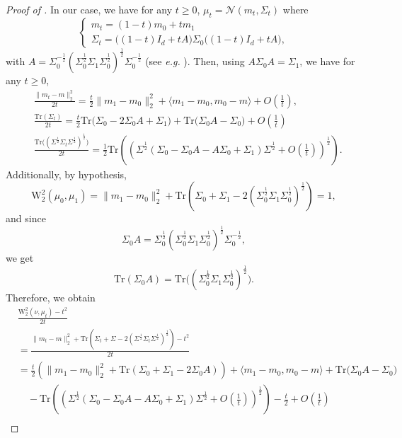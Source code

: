 \documentclass[twoside]{article}
\newcommand{\W}{\mathrm{W}}
\newcommand{\tr}{\mathrm{Tr}}
\def\mo{m_{0}}
\def\m1{m_{1}}
\def\So{\Sigma_{0}}
\def\S1{\Sigma_{1}}
\begin{document}
\begin{proof}[Proof of ]
    In our case, we have for any $t\ge 0$, $\mu_t =\mathcal{N}(m_t, \Sigma_t)$ where
    \begin{equation}
        \begin{cases}
            m_t = (1-t)\mo+t \m1 \\
            \Sigma_t = \big((1-t)I_d+t A\big)\So \big((1-t)I_d + t A\big),
        \end{cases}
    \end{equation}
    with $A=\So^{-\frac12}(\So^\frac12\S1\So^\frac12)^\frac12\So^{-\frac12}$ (see \emph{e.g.} \citep[Appendix A.1]{altschuler2021averaging}). Then, using $A\So A = \S1$, we have for any $t\ge 0$,
    \begin{align}
        &\frac{\|m_t-m\|_2^2}{2t} = \frac{t}{2} \|\m1-\mo\|_2^2 + \langle \m1-\mo, \mo-m\rangle + O\left(\frac{1}{t}\right), \\
        &\frac{\mathrm{Tr}(\Sigma_t)}{2t} = \frac{t}{2} \tr\big(\So-2\So A+\S1\big) + \tr\big(\So A-\So\big) + O\left(\frac{1}{t}\right) \\
        &\frac{\tr\big((\Sigma^\frac12 \Sigma_t \Sigma^\frac12)^\frac12\big)}{2t} = \frac12 \tr\left(\left(\Sigma^\frac12 (\So-\So A-A\So+\S1)\Sigma^\frac12 + O\left(\frac{1}{t}\right) \right)^\frac12\right).
    \end{align}
    Additionally, by hypothesis,
    \begin{equation}
        \W_2^2(\mu_0,\mu_1) = \|\m1-\mo\|_2^2 + \tr(\So+\S1-2(\So^\frac12 \S1 \So^{\frac12})^\frac12) = 1,
    \end{equation}
    and since
    \begin{equation}
        \So A = \So^{\frac12}(\So^\frac12 \S1 \So^\frac12)^\frac12 \So^{-\frac12},
    \end{equation}
    we get
    \begin{equation}
        \tr(\So A) = \tr\big((\So^\frac12 \S1 \So^{\frac12})^\frac12\big).
    \end{equation}
    Therefore, we obtain
    \begin{equation}
        \begin{aligned}
            &\frac{\W_2^2(\nu,\mu_t)-t^2}{2t} \\ &= \frac{\|m_t-m\|_2^2 + \tr\left(\Sigma_t+\Sigma-2(\Sigma^\frac12 \Sigma_t \Sigma^\frac12)^\frac12\right)-t^2}{2t} \\ 
            &= \frac{t}{2}\left(\|\m1-\mo\|_2^2 + \tr(\So + \S1 - 2 \So A)\right) + \langle \m1-\mo, \mo-m\rangle + \tr\big(\So A-\So\big) \\ &\quad -  \tr\left(\left(\Sigma^\frac12 (\So-\So A-A\So+\S1)\Sigma^\frac12 + O\left(\frac{1}{t}\right) \right)^\frac12\right) - \frac{t}{2} + O\left(\frac{1}{t}\right) \\

\end{aligned}
\end{equation}
\end{proof}
\end{document}
